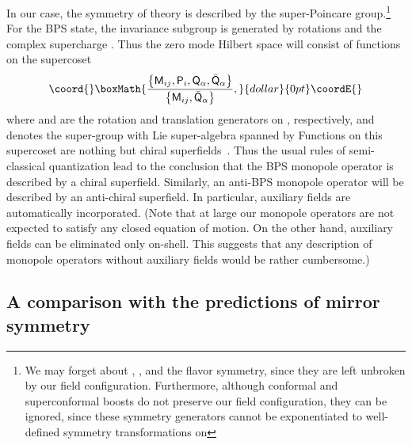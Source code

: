 \documentclass[a4paper,12pt, amsfonts, amssymb]{article}
\providecommand{\RR}{{\mathbb R}}
\providecommand{\Q}{{\mathsf Q}}
\renewcommand{\P}{{\mathsf P}}
\providecommand{\M}{{\mathsf M}}
\begin{document}
In our case, the symmetry of theory is described by the \coordHE{}  \coordHE{} super-Poincare group.\footnote{We may forget about \coordHE{}, \coordHE{}, and
the flavor symmetry, since they are left unbroken by our field configuration.
Furthermore, although conformal and superconformal boosts do not preserve 
our field configuration, they can be ignored, since these symmetry generators cannot be exponentiated to well-defined symmetry transformations on \myHighlight{$\RR^3.$}\coordHE{}}
For the BPS state, the invariance subgroup is generated by rotations
and the complex supercharge \myHighlight{${\bar\Q}_\alpha$}\coordHE{}.
Thus the zero mode Hilbert space will consist of functions on the supercoset
$$\coord{}\boxMath{
\frac{\left\{\M_{ij}, \P_i, \Q_\alpha, 
{\bar\Q}_\alpha\right\}}{\left\{\M_{ij}, {\bar\Q}_\alpha\right\}},
}{dollar}{0pt}\coordE{}$$
where \myHighlight{$\M_{ij}$}\coordHE{} and \myHighlight{$\P_i$}\coordHE{} are the rotation and translation generators on \myHighlight{$\RR^3$}\coordHE{}, respectively, and \coordHE{} denotes the super-group with Lie
super-algebra spanned by \coordHE{}
Functions on this supercoset are nothing but \coordHE{}  \coordHE{} chiral
superfields~\cite{HS}. Thus the usual rules of semi-classical 
quantization lead to the conclusion that the BPS monopole operator is 
described by a chiral superfield. Similarly, an anti-BPS monopole operator 
will be described by an anti-chiral superfield. In particular, \coordHE{} 
auxiliary fields are automatically incorporated. 
(Note that at large \coordHE{} our monopole operators are not expected to satisfy 
any closed equation of motion. On the other hand, auxiliary fields can
be eliminated only on-shell. This suggests that any description of
monopole operators without auxiliary fields would be rather cumbersome.) 


\subsection{A comparison with the predictions of \coordHE{} mirror symmetry}
\end{document}
